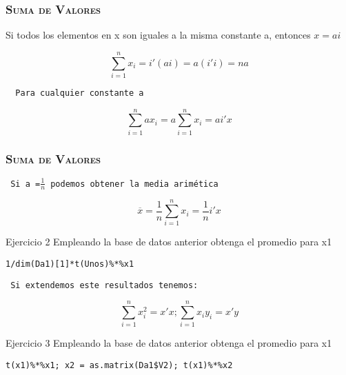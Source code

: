 \documentclass[16.5pt]{beamer}
\begin{document}
{
\begin{frame}
\frametitle{\textsc{\textbf{Suma de Valores}}}
\hspace*{-5mm}
\vspace*{-5mm} 
\vspace{0.5cm}

{\color{blue} Si todos los elementos en x son iguales a la misma constante a, entonces $x=ai$} 

$$\sum_{i=1}^n x_i = i'(ai) = a(i'i) = na$$

\texttt{  {\color{blue} Para cualquier constante a} }

$$\sum_{i=1}^n a x_i =a\sum_{i=1}^n  x_i= ai'x$$

\end{frame}
}






{
\begin{frame}
\frametitle{\textsc{\textbf{Suma de Valores}}}
\hspace*{-5mm}
\vspace*{-2mm} 
\vspace{0.3cm}

\texttt{{\color{blue} Si a =$\frac{1}{n}$ podemos obtener la media arimética}}
\begin{tiny}
\[ \overline{x} = \frac{1}{n}\sum_{i=1}^n  x_i =\frac{1}{n}i'x \]
\end{tiny}

\begin{bclogo}{Ejercicio 2}
 {\tiny\color{blue} Empleando la base de datos anterior obtenga el promedio para x1}
\begin{lstlisting}[basicstyle=\tiny]
1/dim(Da1)[1]*t(Unos)%*%x1
\end{lstlisting}
\end{bclogo}


\texttt{  {\color{blue} Si extendemos este resultados tenemos:}}

\begin{tiny}
\[ \sum_{i=1}^n  x_i^2 = x'x; \sum_{i=1}^n  x_iy_i = x'y \]
\end{tiny}


\begin{bclogo}{Ejercicio 3}
 {\tiny\color{blue} Empleando la base de datos anterior obtenga el promedio para x1}
\begin{lstlisting}[basicstyle=\tiny]
t(x1)%*%x1; x2 = as.matrix(Da1$V2); t(x1)%*%x2
\end{lstlisting}
\end{bclogo}

\end{frame}
}
\end{document}
